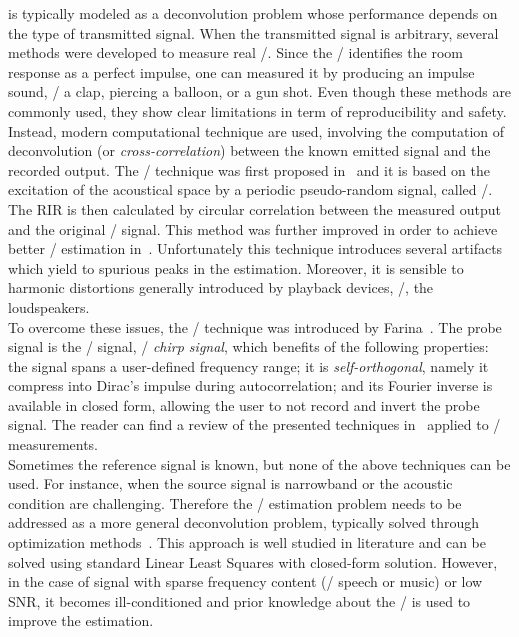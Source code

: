  is typically modeled as a deconvolution problem whose performance depends on the type of transmitted signal.
When the transmitted signal is arbitrary, several methods were developed to measure real \RIRs/.
Since the \RIR/ identifies the room response as a perfect impulse, one can measured it by producing an impulse sound, \eg/ a clap, piercing a balloon, or a gun shot.
Even though these methods are commonly used, they show clear limitations in term of reproducibility and safety.
Instead, modern computational technique are used, involving the computation of deconvolution (or \textit{cross-correlation}) between the known emitted signal and the recorded output.
The \MLSdef/ technique was first proposed in~ and it is based on the excitation of the acoustical space by a periodic pseudo-random signal, called \MLS/.
The RIR is then calculated by circular correlation between the measured output and the original \MLS/ signal.
This method was further improved in order to achieve better \RIR/ estimation in~.
Unfortunately this technique introduces several artifacts which yield to spurious peaks in the estimation.
Moreover, it is sensible to harmonic distortions generally introduced by playback devices, \eg/, the loudspeakers.
\\To overcome these issues, the \ESSdef/ technique was introduced by Farina~.
The probe signal is the \ESS/ signal, \aka/ \textit{chirp signal}, which benefits of the following properties:
the signal spans a user-defined frequency range; it is \textit{self-orthogonal}, namely it compress into Dirac's impulse during autocorrelation;
and its Fourier inverse is available in closed form, allowing the user to not record and invert the probe signal.
The reader can find a review of the presented techniques in~ applied to \RIR/ measurements.
\\Sometimes the reference signal is known, but none of the above techniques can be used.
For instance, when the source signal is narrowband or the acoustic condition are challenging.
Therefore the \RIR/ estimation problem needs to be addressed as a more general deconvolution problem, typically solved through optimization methods~.
This approach is well studied in literature and can be solved using standard Linear Least Squares with closed-form solution.
However, in the case of signal with sparse frequency content (\eg/ speech or music) or low SNR, it becomes ill-conditioned and prior knowledge about the \RIR/ is used to improve the estimation.


